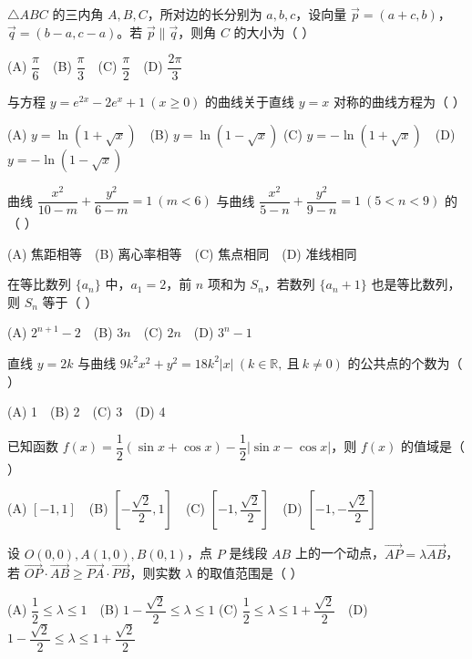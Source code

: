 \begin{question}
$\triangle ABC$ 的三内角 $A,B,C$，所对边的长分别为 $a,b,c$，设向量 $\vec p=(a+c,b)$，$\vec q=(b-a,c-a)$。若 $\vec p\parallel\vec q$，则角 $C$ 的大小为（ ）

(A) $\dfrac{\pi}{6}$　(B) $\dfrac{\pi}{3}$　(C) $\dfrac{\pi}{2}$　(D) $\dfrac{2\pi}{3}$

\end{question}
\begin{question}
与方程 $y=e^{2x}-2e^x+1\ (x\geq0)$ 的曲线关于直线 $y=x$ 对称的曲线方程为（ ）

(A) $y=\ln(1+\sqrt{x})$　(B) $y=\ln(1-\sqrt{x})$
(C) $y=-\ln(1+\sqrt{x})$　(D) $y=-\ln(1-\sqrt{x})$

\end{question}
\begin{question}
曲线 $\dfrac{x^2}{10-m}+\dfrac{y^2}{6-m}=1\ (m<6)$ 与曲线 $\dfrac{x^2}{5-n}+\dfrac{y^2}{9-n}=1\ (5<n<9)$ 的（ ）

(A) 焦距相等　(B) 离心率相等　(C) 焦点相同　(D) 准线相同

\end{question}
\begin{question}
在等比数列 $\{a_n\}$ 中，$a_1=2$，前 $n$ 项和为 $S_n$，若数列 $\{a_n+1\}$ 也是等比数列，则 $S_n$ 等于（ ）

(A) $2^{n+1}-2$　(B) $3n$　(C) $2n$　(D) $3^n-1$

\end{question}
\begin{question}
直线 $y=2k$ 与曲线 $9k^2x^2+y^2=18k^2|x|\ (k\in\mathbb R,\ \text{且}\ k\ne0)$ 的公共点的个数为（ ）

(A) 1　(B) 2　(C) 3　(D) 4

\end{question}
\begin{question}
已知函数 $f(x)=\dfrac12(\sin x+\cos x)-\dfrac12|\sin x-\cos x|$，则 $f(x)$ 的值域是（ ）

(A) $[-1,1]$　(B) $[-\dfrac{\sqrt2}{2},1]$　(C) $[-1,\dfrac{\sqrt2}{2}]$　(D) $[-1,-\dfrac{\sqrt2}{2}]$

\end{question}
\begin{question}
设 $O(0,0),A(1,0),B(0,1)$，点 $P$ 是线段 $AB$ 上的一个动点，$\overrightarrow{AP}=\lambda\overrightarrow{AB}$，若 $\overrightarrow{OP}\cdot\overrightarrow{AB}\geq\overrightarrow{PA}\cdot\overrightarrow{PB}$，则实数 $\lambda$ 的取值范围是（ ）

(A) $\dfrac12\leq\lambda\leq1$　(B) $1-\dfrac{\sqrt2}{2}\leq\lambda\leq1$
(C) $\dfrac12\leq\lambda\leq1+\dfrac{\sqrt2}{2}$　(D) $1-\dfrac{\sqrt2}{2}\leq\lambda\leq1+\dfrac{\sqrt2}{2}$

\end{question}

